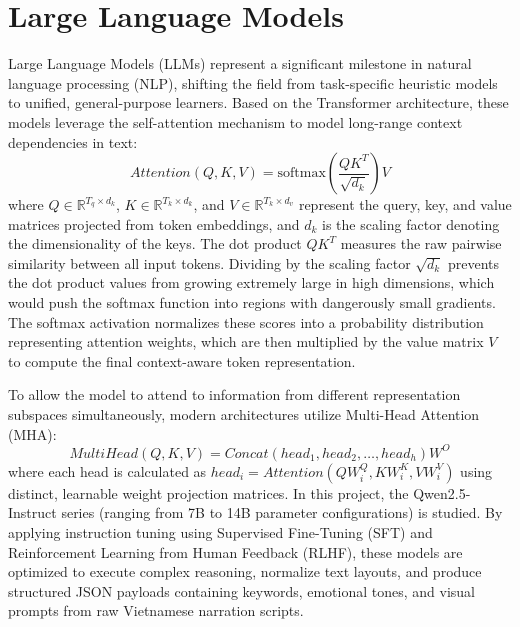 \documentclass[a4paper,12pt]{report}
\begin{document}
\section{Large Language Models}
Large Language Models (LLMs) represent a significant milestone in natural language processing (NLP), shifting the field from task-specific heuristic models to unified, general-purpose learners. Based on the Transformer architecture, these models leverage the self-attention mechanism to model long-range context dependencies in text:
\begin{equation}
    Attention(Q, K, V) = \text{softmax}\left(\frac{QK^T}{\sqrt{d_k}}\right)V
\end{equation}
where $Q \in \mathbb{R}^{T_q \times d_k}$, $K \in \mathbb{R}^{T_k \times d_k}$, and $V \in \mathbb{R}^{T_k \times d_v}$ represent the query, key, and value matrices projected from token embeddings, and $d_k$ is the scaling factor denoting the dimensionality of the keys. The dot product $QK^T$ measures the raw pairwise similarity between all input tokens. Dividing by the scaling factor $\sqrt{d_k}$ prevents the dot product values from growing extremely large in high dimensions, which would push the softmax function into regions with dangerously small gradients. The softmax activation normalizes these scores into a probability distribution representing attention weights, which are then multiplied by the value matrix $V$ to compute the final context-aware token representation.

To allow the model to attend to information from different representation subspaces simultaneously, modern architectures utilize Multi-Head Attention (MHA):
\begin{equation}
    MultiHead(Q, K, V) = Concat(head_1, head_2, \dots, head_h)W^O
\end{equation}
where each head is calculated as $head_i = Attention(QW_i^Q, KW_i^K, VW_i^V)$ using distinct, learnable weight projection matrices. In this project, the Qwen2.5-Instruct series (ranging from 7B to 14B parameter configurations) is studied. By applying instruction tuning using Supervised Fine-Tuning (SFT) and Reinforcement Learning from Human Feedback (RLHF), these models are optimized to execute complex reasoning, normalize text layouts, and produce structured JSON payloads containing keywords, emotional tones, and visual prompts from raw Vietnamese narration scripts.
\end{document}
